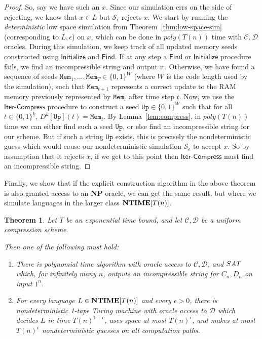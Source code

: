 \documentclass[11pt]{article}
\newtheorem{theorem}{Theorem}
\newcommand{\dash}{\text{-}}
\newcommand{\B}{\{0,1\}}
\def\cl{\bf}
\begin{document}
\begin{proof}
So, say we have such an $x$. Since our simulation errs on the side of rejecting, we know that $x \in L$ but $\mathcal{S}_{\epsilon}$ rejects $x$. We start by running the \emph{deterministic} low space simulation from Theorem~\ref{thm:low-space-sim} (corresponding to $L, \epsilon$) on $x$, which can be done in $poly(T(n))$ time with $\mathcal{C},\mathcal{D}$ oracles. During this simulation, we keep track of all updated memory seeds constructed using $\mathsf{Initialize}$ and $\mathsf{Find}$. If at any step a $\mathsf{Find}$ or $\mathsf{Initialize}$ procedure fails, we find an incompressible string and output it. Otherwise, we have found a sequence of seeds $\mathtt{Mem}_1, \ldots, \mathtt{Mem}_T \in \B^W$ (where $W$ is the code length used by the simulation), such that $\mathtt{Mem}_{t+1}$ represents a correct update to the RAM memory previously represented by $\mathtt{Mem}_t$ after time step $t$. Now, we use the $\mathsf{Iter\dash Compress}$ procedure to construct a seed $\mathtt{Up} \in \B^W$ such that for all $t \in \B^k$, $D^k[\mathtt{Up}](t) = \mathtt{Mem}_t$. By Lemma~\ref{lem:compress}, in $poly(T(n))$ time we can either find such a seed $\mathtt{Up}$, or else find an incompressible string for our scheme. But if such a string $\mathtt{Up}$ exists, this is precisely the nondeterministic guess which would cause our nondeterministic simulation $\mathcal{S}_{\epsilon}$ to accept $x$. So by assumption that it rejects $x$, if we get to this point then $\mathsf{Iter\dash Compress}$ must find an incompressible string.
\end{proof}
Finally, we show that if the explicit construction algorithm in the above theorem is also granted access to an {\cl NP} oracle, we can get the same result, but where we simulate languages in the larger class ${\cl NTIME}[T(n)]$.
\begin{theorem}\label{thm:full-ntisp-sim}
Let $T$ be an exponential time bound, and let $\mathcal{C},\mathcal{D}$ be a uniform compression scheme.

Then one of the following must hold:
\begin{enumerate}
    \item There is polynomial time algorithm with oracle access to $\mathcal{C},\mathcal{D}$, and ${\sc SAT}$ which, for infinitely many $n$, outputs an incompressible string for $C_n,D_n$ on input $1^n$.
    \item For every language $L \in {\cl NTIME}[T(n)]$ and every $\epsilon > 0$, there is nondeterministic 1-tape Turing machine with oracle access to $\mathcal{D}$ which decides $L$ in time $T(n)^{1+\epsilon}$, uses space at most $T(n)^{\epsilon}$, and makes at most $T(n)^{\epsilon}$ nondeterministic guesses on all computation paths.
\end{enumerate}
\end{theorem}
\end{document}
